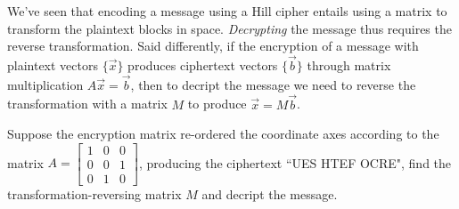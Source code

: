 \documentclass{ximera}
\begin{document}
We've seen that encoding a message using a Hill cipher entails using a matrix to transform the plaintext blocks in space. \emph{Decrypting} the message thus requires the reverse transformation. Said differently, if the encryption of a message with plaintext vectors $\lbrace \vec{x}\rbrace$ produces ciphertext vectors $\lbrace \vec{b}\rbrace$ through matrix multiplication $A\vec{x}=\vec{b}$, then to decript the message we need to reverse the transformation with a matrix $M$ to produce $\vec{x}=M\vec{b}$.

\begin{example}
  Suppose the encryption matrix re-ordered the coordinate axes according to the matrix $A=\begin{bmatrix}
    1&0&0\\0&0&1\\0&1&0
  \end{bmatrix}$, producing the ciphertext ``UES HTEF OCRE", find the transformation-reversing matrix $M$ and decript the message.
\end{example}
\end{document}
